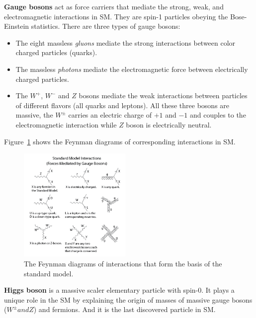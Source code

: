 \textbf{Gauge bosons}
act as force carriers that mediate the strong, weak, and electromagnetic interactions in SM.
They are spin-1 particles obeying the Bose-Einstein statistics. 
There are three types of gauge bosons:
\begin{itemize}
  \item The eight massless \textit{gluons} mediate the strong interactions between color charged particles (quarks).
  \item The massless \textit{photons} mediate the electromagnetic force between electrically charged particles.
  \item The $W^{+}$, $W^{-}$ and $Z$ bosons mediate the weak interactions between particles of different flavors (all quarks and leptons). All these three bosons are massive, the $W^{\pm}$ carries an electric charge of $+1$ and $−1$ and couples to the electromagnetic interaction while $Z$ boson is electrically neutral.
\end{itemize}
Figure~\ref{fig:eleP-2} shows the Feynman diagrams of corresponding interactions in SM.
\begin{figure}[!htb]
  \centering
  \includegraphics[width=0.48\textwidth]{figures/Theory/Standard_Model_Feynman_Diagram_Vertices.png}
  \caption{The Feynman diagrams of interactions that form the basis of the standard model.}
  \label{fig:eleP-2}
\end{figure}

\textbf{Higgs boson}
is a massive scaler elementary particle with spin-0. 
It plays a unique role in the SM by explaining the origin of masses of massive gauge bosons ($W^{\pm} and Z$) and fermions. 
And it is the last discovered particle in SM.

